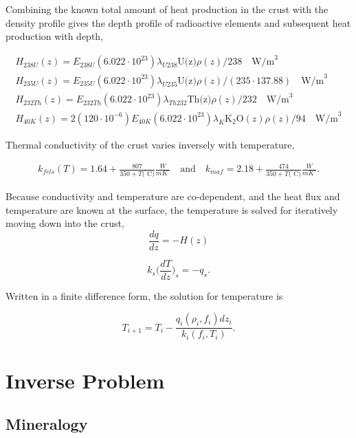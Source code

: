 \documentclass[a4paper,10pt]{article}
\begin{document}
\noindent Combining the known total amount of heat production in the crust with the density profile gives the depth profile of radioactive elements and subsequent heat production with depth, 

\begin{eqnarray}
H_{238U}(z)=E_{238U}(6.022\cdot 10^{23})\lambda_{U238}\text{U(z)}\rho(z)/238 \quad  \text{W/m}^3\\
H_{235U}(z)=E_{235U}(6.022\cdot 10^{23})\lambda_{U235}\text{U(z)}\rho(z)/(235\cdot 137.88)  \quad \text{W/m}^3\\
H_{232Th}(z)=E_{232Th}(6.022\cdot 10^{23})\lambda_{Th232}\text{Th(z)}\rho(z)/232 \quad  \text{W/m}^3\\
H_{40K}(z)=2(120\cdot 10^{-6})E_{40K}(6.022\cdot 10^{23})\lambda_{K}\text{K$_2$O}(z)\rho(z)/94 \quad  \text{W/m}^3
\end{eqnarray}

\noindent Thermal conductivity of the crust varies inversely with temperature, 

\begin{eqnarray}
k_{fels}(T)=1.64+\frac{807}{350+T(^{\circ}\text{C)}} \frac{W}{mK^{\circ}} \quad \text{and} \quad k_{maf}=2.18+\frac{474}{350+T(^{\circ}\text{C)}}  \frac{W}{mK^{\circ}}.
\end{eqnarray}

\noindent Because conductivity and temperature are co-dependent, and the heat flux and temperature are known at the surface, the temperature is solved for iteratively moving down into the crust, 
\begin{equation}
\frac{dq}{dz}=-H(z) 
\end{equation}

\begin{equation}
k_s\Big(\frac{dT}{dz}\Big)_{s}=-q_s.
\end{equation}

\noindent Written in a finite difference form, the solution for temperature is 

\begin{equation}
T_{i+1}=T_i-\frac{q_i(\rho_i,f_i)dz_i}{k_i(f_i,T_i)}.
\end{equation}


\section{Inverse Problem}

\subsection{Mineralogy}
\end{document}
